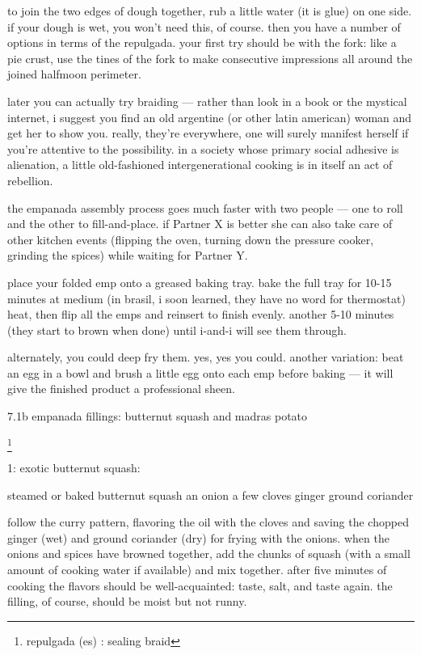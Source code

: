to join the two edges of dough together, rub a little water (it is glue) on one side. if your dough is wet, you won't need this, of course. then you have a number of options in terms of the repulgada. your first try should be with the fork: like a pie crust, use the tines of the fork to make consecutive impressions all around the joined halfmoon perimeter.

later you can actually try braiding --- rather than look in a book or the mystical internet, i suggest you find an old argentine (or other latin american) woman and get her to show you. really, they're everywhere, one will surely manifest herself if you're attentive to the possibility. in a society whose primary social adhesive is alienation, a little old-fashioned intergenerational cooking is in itself an act of rebellion.

the empanada assembly process goes much faster with two people --- one to roll and the other to fill-and-place. if Partner X is better she can also take care of other kitchen events (flipping the oven, turning down the pressure cooker, grinding the spices) while waiting for Partner Y.

place your folded emp onto a greased baking tray. bake the full tray for 10-15 minutes at medium (in brasil, i soon learned, they have no word for thermostat) heat, then flip all the emps and reinsert to finish evenly. another 5-10 minutes (they start to brown when done) until i-and-i will see them through.

alternately, you could deep fry them. yes, yes you could. another variation: beat an egg in a bowl and brush a little egg onto each emp before baking --- it will give the finished product a professional sheen.


7.1b  empanada fillings: butternut squash and madras potato

\footnote{repulgada (es) : sealing braid}

1: exotic butternut squash:

steamed or baked butternut squash
an onion
a few cloves
ginger
ground coriander

	follow the curry pattern, flavoring the oil with the cloves and saving the chopped ginger (wet) and ground coriander (dry) for frying with the onions. when the onions and spices have browned together, add the chunks of squash (with a small amount of cooking water if available) and mix together. after five minutes of cooking the flavors should be well-acquainted: taste, salt, and taste again.
	the filling, of course, should be moist but not runny.


